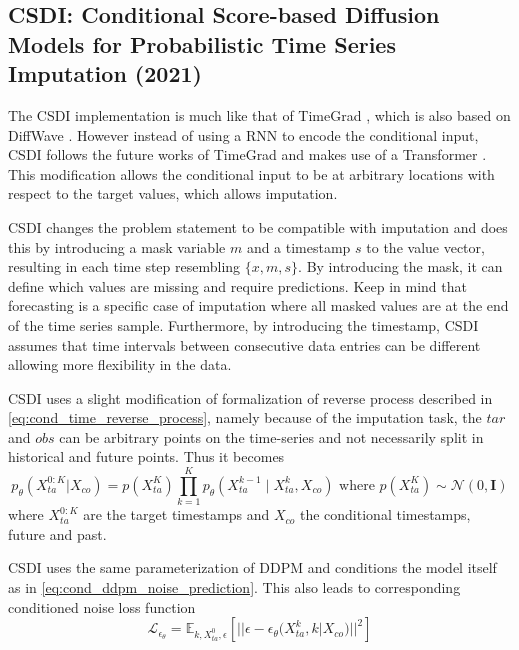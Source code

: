 \subsection{CSDI: Conditional Score-based Diffusion Models for Probabilistic Time Series Imputation (2021) \cite{tashiro_csdi_2021}} \label{sec:csdi}
The CSDI implementation is much like that of TimeGrad \cite{rasul_autoregressive_2021}, which is also based on DiffWave \cite{kong_diffwave_2020}. However instead of using a RNN to encode the conditional input, CSDI follows the future works of TimeGrad and makes use of a Transformer \cite{vaswani_attention_2017}. This modification allows the conditional input to be at arbitrary locations with respect to the target values, which allows imputation. 

CSDI changes the problem statement to be compatible with imputation and does this by introducing a mask variable $m$ and a timestamp $s$ to the value vector, resulting in each time step resembling $\{x, m, s\}$. By introducing the mask, it can define which values are missing and require predictions. Keep in mind that forecasting is a specific case of imputation where all masked values are at the end of the time series sample. Furthermore, by introducing the timestamp, CSDI assumes that time intervals between consecutive data entries can be different allowing more flexibility in the data.

CSDI uses a slight modification of formalization of reverse process described in  \autoref{eq:cond_time_reverse_process}, namely because of the imputation task, the $tar$ and $obs$ can be arbitrary points on the time-series and not necessarily split in historical and future points. Thus it becomes
\begin{equation}
 \label{eq:csdi_reverse_process}
     p_\theta(X_{ta}^{0:K} | X_{co}) = p(X_{ta}^K)\prod_{k=1}^{K} p_\theta(X_{ta}^{k-1} \mid X_{ta}^k, X_{co}) \text{ where } p(X_{ta}^K) \sim \mathcal{N}(0, \mathbf{I})
\end{equation}
where $X_{ta}^{0:K}$ are the target timestamps and $X_{co}$ the conditional timestamps, future and past.

CSDI uses the same parameterization of DDPM and conditions the model itself as in \autoref{eq:cond_ddpm_noise_prediction}. This also leads to corresponding conditioned noise loss function
\begin{equation}
\label{eq:csdi_loss_function}
    \mathcal{L}_{\epsilon_\theta} = \mathbb{E}_{k, X_{ta}^0, \epsilon} \left[|| \epsilon - \epsilon_\theta(X_{ta}^k,  k | X_{co})||^2 \right]
\end{equation}

